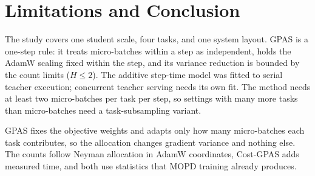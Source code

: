 \section{Limitations and Conclusion}
\label{sec:conclusion}

The study covers one student scale, four tasks, and one system layout. GPAS
is a one-step rule: it treats micro-batches within a step as independent,
holds the AdamW scaling fixed within the step, and its variance reduction is
bounded by the count limits ($H\leq2$). The additive step-time model was
fitted to serial teacher execution; concurrent teacher serving needs its own
fit. The method needs at least two micro-batches per task per step, so
settings with many more tasks than micro-batches need a task-subsampling
variant.

GPAS fixes the objective weights and adapts only how many micro-batches each
task contributes, so the allocation changes gradient variance and nothing
else. The counts follow Neyman allocation in AdamW coordinates, Cost-GPAS adds
measured time, and both use statistics that MOPD training already produces.
